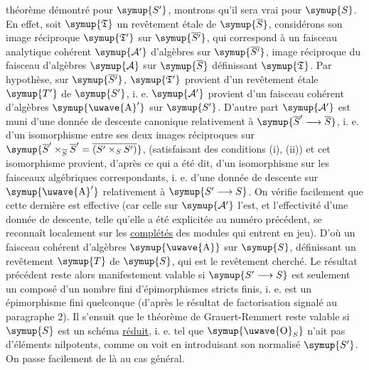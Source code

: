 théorème démontré pour $\symup{S'}$, montrons qu'il sera vrai pour $\symup{S}$. En effet, soit
$\symup{\mathfrak T}$ un revêtement étale de $\symup{\overline S}$, considérons son image
réciproque $\symup{\mathfrak T'}$ sur $\symup{\overline{S'}}$, qui correspond à un faisceau
analytique cohérent $\symup{\mathcal A'}$ d'algèbres sur $\symup{\overline{S'}}$, image
réciproque du faisceau d'algèbres $\symup{\mathcal A}$ sur $\symup{\overline S}$ définissant
$\symup{\mathfrak T}$. Par hypothèse, sur $\symup{\overline{S'}}$, $\symup{\mathfrak T'}$ provient d'un
revêtement étale $\symup{T'}$ de $\symup{S'}$, i. e. $\symup{\mathcal A'}$ provient d'un faisceau
cohérent d'algèbres $\symup{\text{\uwave{A}}'}$ sur $\symup{S'}$. D'autre part $\symup{\mathcal A'}$ est muni d'une
donnée de descente canonique relativement à
$\symup{\overline S'\longrightarrow\overline S}$, i. e. d'un isomorphisme entre ses
deux images réciproques sur $\symup{\overline S'\times_{\overline S}\overline S'=\overline{(S'\times_SS')}}$, (satisfaisant des conditions (i), (ii)) et cet isomorphisme provient, d'après
ce qui a été dit, d'un isomorphisme sur les faisceaux algébriques
correspondants, i. e. d'une donnée de descente sur $\symup{\text{\uwave{A}}'}$ relativement à
$\symup{S'\longrightarrow S}$. On vérifie facilement que cette dernière est effective
(car celle sur $\symup{\mathcal A'}$ l'est, et l'effectivité d'une donnée de descente,
telle qu'elle a été explicitée au numéro précédent, se reconnaît localement sur
les \uline{complétés} des modules qui entrent en jeu). D'où un faisceau cohérent
d'algèbres $\symup{\text{\uwave{A}}}$ sur $\symup{S}$, définissant un revêtement $\symup{T}$ de $\symup{S}$, qui est le
revêtement cherché. Le résultat précédent reste alors manifestement valable si
$\symup{S'\longrightarrow S}$ est seulement un composé d'un nombre fini
d'épimorphismes stricts finis, i. e. est un épimorphisme fini quelconque (d'après
le résultat de factorisation signalé au paragraphe 2). Il s'ensuit que le
théorème de Grauert-Remmert reste valable si $\symup{S}$ est un schéma \uline{réduit},
i. e. tel que $\symup{\text{\uwave{O}}_S}$ n'ait pas d'éléments nilpotents, comme on voit en
introduisant son normalisé $\symup{S'}$. On passe facilement de là au cas général.

